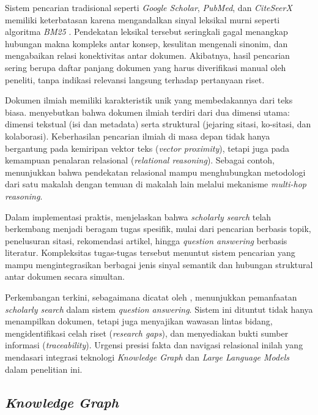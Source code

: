 Sistem pencarian tradisional seperti \textit{Google Scholar}, \textit{PubMed}, dan \textit{CiteSeerX} memiliki keterbatasan karena mengandalkan sinyal leksikal murni seperti algoritma \textit{BM25} \citep{10.1007/s11192-020-03690-4}. Pendekatan leksikal tersebut seringkali gagal menangkap hubungan makna kompleks antar konsep, kesulitan mengenali sinonim, dan mengabaikan relasi konektivitas antar dokumen. Akibatnya, hasil pencarian sering berupa daftar panjang dokumen yang harus diverifikasi manual oleh peneliti, tanpa indikasi relevansi langsung terhadap pertanyaan riset.

Dokumen ilmiah memiliki karakteristik unik yang membedakannya dari teks biasa. \citet{Shen2016ModelingTA} menyebutkan bahwa dokumen ilmiah terdiri dari dua dimensi utama: dimensi tekstual (isi dan metadata) serta struktural (jejaring sitasi, ko-sitasi, dan kolaborasi). Keberhasilan pencarian ilmiah di masa depan tidak hanya bergantung pada kemiripan vektor teks (\textit{vector proximity}), tetapi juga pada kemampuan penalaran relasional (\textit{relational reasoning}). Sebagai contoh, \citet{avgoren2025enhancing} menunjukkan bahwa pendekatan relasional mampu menghubungkan metodologi dari satu makalah dengan temuan di makalah lain melalui mekanisme \textit{multi-hop reasoning}.

Dalam implementasi praktis, \citet{9522111} menjelaskan bahwa \textit{scholarly search} telah berkembang menjadi beragam tugas spesifik, mulai dari pencarian berbasis topik, penelusuran sitasi, rekomendasi artikel, hingga \textit{question answering} berbasis literatur. Kompleksitas tugas-tugas tersebut menuntut sistem pencarian yang mampu mengintegrasikan berbagai jenis sinyal semantik dan hubungan struktural antar dokumen secara simultan.

Perkembangan terkini, sebagaimana dicatat oleh \citet{gupta2024comprehensivesurveyretrievalaugmentedgeneration}, menunjukkan pemanfaatan \textit{scholarly search} dalam sistem \textit{question answering}. Sistem ini dituntut tidak hanya menampilkan dokumen, tetapi juga menyajikan wawasan lintas bidang, mengidentifikasi celah riset (\textit{research gaps}), dan menyediakan bukti sumber informasi (\textit{traceability}). Urgensi presisi fakta dan navigasi relasional inilah yang mendasari integrasi teknologi \textit{Knowledge Graph} dan \textit{Large Language Models} dalam penelitian ini.

\subsection{\textit{Knowledge Graph}}

